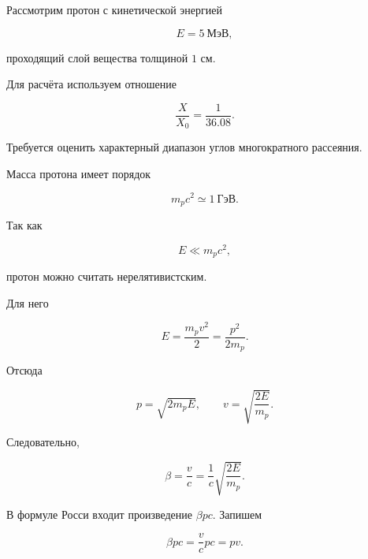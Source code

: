 \documentclass[../final.tex]{subfiles}
\begin{document}


\condition

Рассмотрим протон с кинетической энергией

\begin{equation*}
    E=5\ \text{МэВ},
\end{equation*}

проходящий слой вещества толщиной $1$ см.

Для расчёта используем отношение

\begin{equation*}
    \frac{X}{X_0}
    =
    \frac{1}{36.08}.
\end{equation*}

Требуется оценить характерный диапазон углов
многократного рассеяния.

Масса протона имеет порядок

\begin{equation*}
    m_pc^2\simeq1\ \text{ГэВ}.
\end{equation*}

Так как

\begin{equation*}
    E\ll m_pc^2,
\end{equation*}

протон можно считать нерелятивистским.

Для него

\begin{equation*}
    E
    =
    \frac{m_pv^2}{2}
    =
    \frac{p^2}{2m_p}.
\end{equation*}

Отсюда

\begin{equation*}
    p=\sqrt{2m_pE},
    \qquad
    v=\sqrt{\frac{2E}{m_p}}.
\end{equation*}

Следовательно,

\begin{equation*}
    \beta
    =
    \frac{v}{c}
    =
    \frac{1}{c}
    \sqrt{\frac{2E}{m_p}}.
\end{equation*}

В формуле Росси входит произведение $\beta pc$.
Запишем

\begin{equation*}
    \beta pc
    =
    \frac{v}{c}pc
    =
    pv.
\end{equation*}
\end{document}
